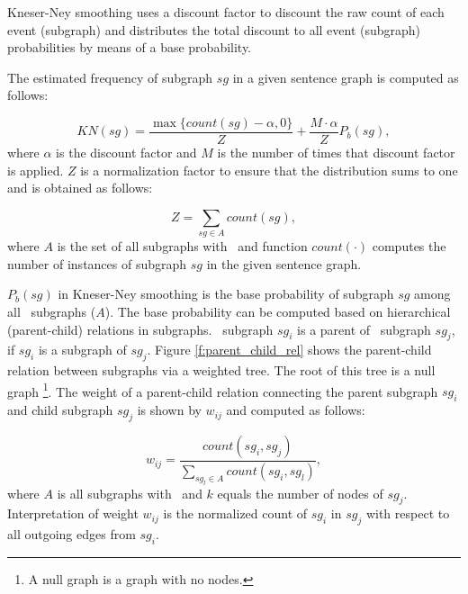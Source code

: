 \begin{figure*}[!t]
\centering
\small
\caption{parent child relation.} 
\label{f:parent_child_rel}
\end{figure*}

Kneser-Ney smoothing uses a discount factor to discount the raw count
of each event (subgraph) and distributes the total discount to all
event (subgraph) probabilities by means of a base probability.

The estimated frequency of subgraph $sg$ in a given sentence graph
is computed as follows:

\begin{equation*}
KN(sg) = \frac{\max \lbrace	 count(sg)-\alpha, 0 \rbrace }{Z} + \frac{M \cdot \alpha}{Z}P_b(sg),
\end{equation*}
%
where $\alpha$ is the discount factor and $M$ is the number of times
that discount factor is applied. $Z$ is a normalization factor
to ensure that the distribution sums to one and is obtained as follows:

\begin{equation*}
Z = \sum_{sg \in A} count(sg),
\end{equation*}
%
where $A$ is the set of all subgraphs with \knodes\ and function
$count(\cdot)$ computes the number of instances of subgraph $sg$ in
the given sentence graph.

$P_b(sg)$ in Kneser-Ney smoothing is the base probability of
subgraph $sg$ among all \knode\ subgraphs ($A$). The base
probability can be computed based on hierarchical (parent-child)
relations in subgraphs. \knode\ subgraph $sg_i$ is a parent
of \kplusnode\ subgraph $sg_j$, if $sg_i$ is a subgraph of
$sg_j$. Figure \ref{f:parent_child_rel} shows the parent-child
relation between subgraphs via a weighted tree. The root of this tree
is a null graph
\footnote{A null graph is a graph with no nodes.}. 
The weight of a parent-child relation connecting the parent
subgraph $sg_i$ and child subgraph $sg_j$ is shown by $w_{ij}$ and
computed as follows:

\begin{equation*}
w_{ij} = \frac{count(sg_i, sg_j)}{\sum_{sg_l \in A}count(sg_i,sg_l)},
\end{equation*}
%
where $A$ is all subgraphs with \knode\ and $k$ equals the number of
nodes of $sg_j$. Interpretation of weight $w_{ij}$ is the normalized count of $sg_i$ in $sg_j$ with respect to all outgoing edges from $sg_i$.

